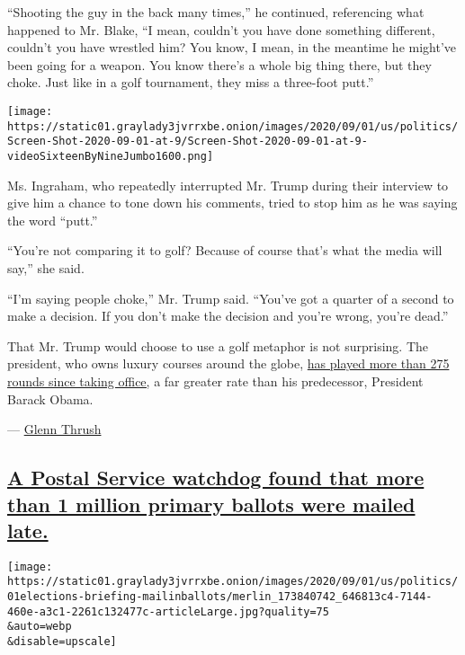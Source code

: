 ``Shooting the guy in the back many times,'' he continued, referencing
what happened to Mr. Blake, ``I mean, couldn't you have done something
different, couldn't you have wrestled him? You know, I mean, in the
meantime he might've been going for a weapon. You know there's a whole
big thing there, but they choke. Just like in a golf tournament, they
miss a three-foot putt.''

\texttt{[image: https://static01.graylady3jvrrxbe.onion/images/2020/09/01/us/politics/Screen-Shot-2020-09-01-at-9/Screen-Shot-2020-09-01-at-9-videoSixteenByNineJumbo1600.png]}

Ms. Ingraham, who repeatedly interrupted Mr. Trump during their
interview to give him a chance to tone down his comments, tried to stop
him as he was saying the word ``putt.''

``You're not comparing it to golf? Because of course that's what the
media will say,'' she said.

``I'm saying people choke,'' Mr. Trump said. ``You've got a quarter of a
second to make a decision. If you don't make the decision and you're
wrong, you're dead.''

That Mr. Trump would choose to use a golf metaphor is not surprising.
The president, who owns luxury courses around the globe,
\href{https://www.cnn.com/2020/07/12/politics/trump-exercise-golf/index.html}{has
played more than 275 rounds since taking office,} a far greater rate
than his predecessor, President Barack Obama.

--- \href{https://www.nytimes3xbfgragh.onion/by/glenn-thrush}{Glenn
Thrush}

\hypertarget{a-postal-service-watchdog-found-that-more-than-1-million-primary-ballots-were-mailed-late}{%
\subsection{\texorpdfstring{\protect\hyperlink{a-postal-service-watchdog-found-that-more-than-1-million-primary-ballots-were-mailed-late}{A
Postal Service watchdog found that more than 1 million primary ballots
were mailed
late.}}{A Postal Service watchdog found that more than 1 million primary ballots were mailed late.}}\label{a-postal-service-watchdog-found-that-more-than-1-million-primary-ballots-were-mailed-late}}

\texttt{[image: https://static01.graylady3jvrrxbe.onion/images/2020/09/01/us/politics/01elections-briefing-mailinballots/merlin\_173840742\_646813c4-7144-460e-a3c1-2261c132477c-articleLarge.jpg?quality=75\\\&auto=webp\\\&disable=upscale]}

